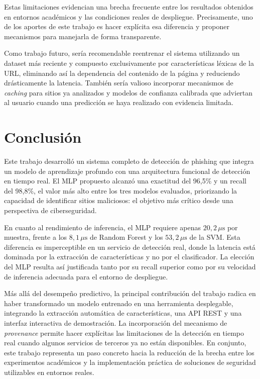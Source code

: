 \documentclass[conference]{IEEEtran}
\begin{document}
Estas limitaciones evidencian una brecha frecuente entre los resultados obtenidos en entornos académicos y las condiciones reales de despliegue. Precisamente, uno de los aportes de este trabajo es hacer explícita esa diferencia y proponer mecanismos para manejarla de forma transparente.

Como trabajo futuro, sería recomendable reentrenar el sistema utilizando un dataset más reciente y compuesto exclusivamente por características léxicas de la URL, eliminando así la dependencia del contenido de la página y reduciendo drásticamente la latencia. También sería valioso incorporar mecanismos de \textit{caching} para sitios ya analizados y modelos de confianza calibrada que adviertan al usuario cuando una predicción se haya realizado con evidencia limitada.

\section{Conclusión}
Este trabajo desarrolló un sistema completo de detección de phishing que integra un modelo de aprendizaje profundo con una arquitectura funcional de detección en tiempo real. El MLP propuesto alcanzó una exactitud del 96,5\% y un recall del 98,8\%, el valor más alto entre los tres modelos evaluados, priorizando la capacidad de identificar sitios maliciosos: el objetivo más crítico desde una perspectiva de ciberseguridad.

En cuanto al rendimiento de inferencia, el MLP requiere apenas $20{,}2\,\mu\text{s}$ por muestra, frente a los $8{,}1\,\mu\text{s}$ de Random Forest y los $53{,}2\,\mu\text{s}$ de la SVM. Esta diferencia es imperceptible en un servicio de detección real, donde la latencia está dominada por la extracción de características y no por el clasificador. La elección del MLP resulta así justificada tanto por su recall superior como por su velocidad de inferencia adecuada para el entorno de despliegue.

Más allá del desempeño predictivo, la principal contribución del trabajo radica en haber transformado un modelo entrenado en una herramienta desplegable, integrando la extracción automática de características, una API REST y una interfaz interactiva de demostración. La incorporación del mecanismo de \textit{provenance} permite hacer explícitas las limitaciones de la detección en tiempo real cuando algunos servicios de terceros ya no están disponibles. En conjunto, este trabajo representa un paso concreto hacia la reducción de la brecha entre los experimentos académicos y la implementación práctica de soluciones de seguridad utilizables en entornos reales.


\end{document}
